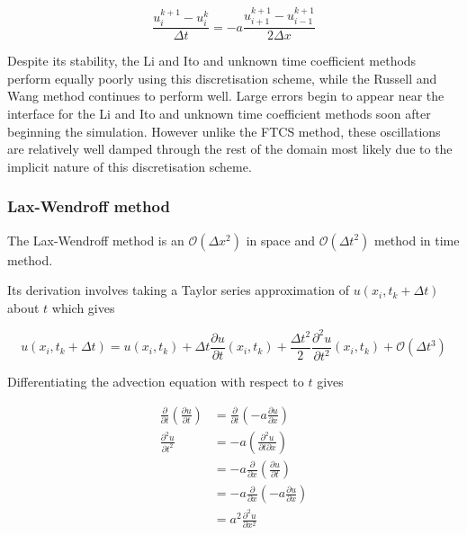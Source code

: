 \begin{equation}
    \frac{u_i^{k+1} - u_i^k}{\Delta t} = -a \frac{u_{i+1}^{k+1} - u_{i-1}^{k+1}}{2 \Delta x}
\end{equation}

Despite its stability, the Li and Ito and unknown time coefficient methods perform equally poorly using this discretisation scheme, while the Russell and Wang method continues to perform well.
Large errors begin to appear near the interface for the Li and Ito and unknown time coefficient methods soon after beginning the simulation.
However unlike the FTCS method, these oscillations are relatively well damped through the rest of the domain most likely due to the implicit nature of this discretisation scheme.

\subsubsection{Lax-Wendroff method}

The Lax-Wendroff method is an $\mathcal{O}(\Delta x^2)$ in space and $\mathcal{O}(\Delta t^2)$ method in time method.

Its derivation involves taking a Taylor series approximation of $u(x_i,t_k +\Delta t)$ about $t$ which gives

\begin{equation}
    u(x_i,t_k + \Delta t) = u(x_i,t_k) + \Delta t \frac{\partial u}{\partial t}(x_i,t_k) + \frac{\Delta t^2}{2} \frac{\partial^2 u}{\partial t^2}(x_i,t_k) + \mathcal{O}(\Delta t^3) \label{laxWendroffTaylor}
\end{equation}

Differentiating the advection equation with respect to $t$ gives

\begin{align}
    \frac{\partial}{\partial t} \left( \frac{\partial u}{\partial t} \right) &= \frac{\partial}{\partial t}\left( -a \frac{\partial u}{\partial x} \right) \\
    \frac{\partial^2 u}{\partial t^2} &= -a \left(\frac{\partial^2 u}{\partial t \partial x}\right) \\
                                      &= -a \frac{\partial}{\partial x} \left(\frac{\partial u}{\partial t} \right) \\
                                      &= -a \frac{\partial}{\partial x} \left(-a \frac{\partial u}{\partial x}\right) \\
                                      &= a^2 \frac{\partial^2 u}{\partial x^2}
\end{align}

